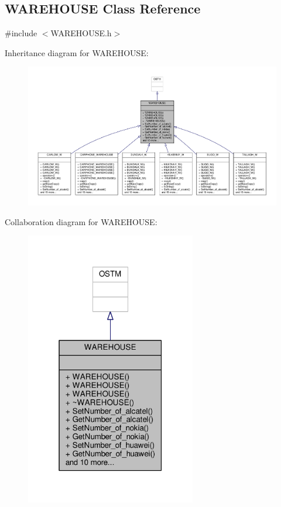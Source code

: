 \hypertarget{class_w_a_r_e_h_o_u_s_e}{}\subsection{W\+A\+R\+E\+H\+O\+U\+SE Class Reference}
\label{class_w_a_r_e_h_o_u_s_e}


{\ttfamily \#include $<$W\+A\+R\+E\+H\+O\+U\+S\+E.\+h$>$}



Inheritance diagram for W\+A\+R\+E\+H\+O\+U\+SE\+:
\nopagebreak
\begin{figure}[H]
\begin{center}
\leavevmode
\includegraphics[width=350pt]{class_w_a_r_e_h_o_u_s_e__inherit__graph}
\end{center}
\end{figure}


Collaboration diagram for W\+A\+R\+E\+H\+O\+U\+SE\+:
\nopagebreak
\begin{figure}[H]
\begin{center}
\leavevmode
\includegraphics[width=211pt]{class_w_a_r_e_h_o_u_s_e__coll__graph}
\end{center}
\end{figure}

